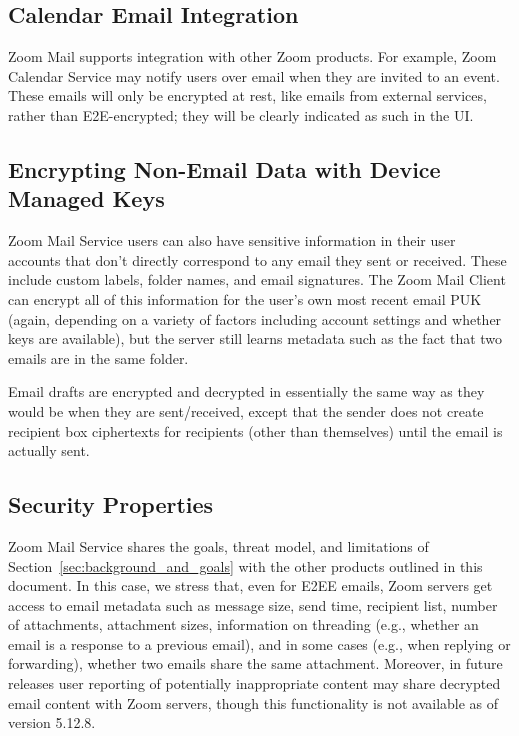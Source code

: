 \subsection{Calendar Email Integration}

Zoom Mail supports integration with other Zoom products. For example, Zoom Calendar Service may
notify users over email when they are invited to an event. These emails will only be encrypted at
rest, like emails from external services, rather than E2E-encrypted; they will be clearly indicated
as such in the UI.

\subsection{Encrypting Non-Email Data with Device Managed Keys}

Zoom Mail Service users can also have sensitive information in their user accounts that don't
directly correspond to any email they sent or received. These include custom labels, folder names,
and email signatures. The Zoom Mail Client can encrypt all of this information for the user's own
most recent email PUK (again, depending on a variety of factors including account settings and whether keys are available), but the server still learns metadata such as the fact that two emails are in
the same folder.

Email drafts are encrypted and decrypted in essentially the same way as they would be when they are
sent/received, except that the sender does not create recipient box ciphertexts for recipients
(other than themselves) until the email is actually sent.

\subsection{Security Properties}

Zoom Mail Service shares the goals, threat model, and limitations of
Section~\ref{sec:background_and_goals} with the other products outlined in this document. In this
case, we stress that, even for E2EE emails, Zoom servers get access to email metadata such as
message size, send time, recipient list, number of attachments, attachment sizes, information on
threading (e.g., whether an email is a response to a previous email), and in some cases (e.g., when
replying or forwarding), whether two emails share the same attachment. Moreover, in future releases
user reporting of potentially inappropriate content may share decrypted email content with Zoom
servers, though this functionality is not available as of version 5.12.8.


